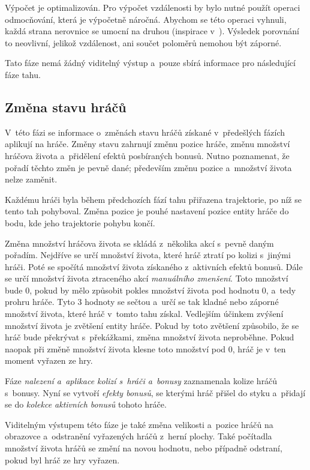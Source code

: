 Výpočet je optimalizován. Pro výpočet vzdálenosti by bylo nutné použít operaci odmocňování, která je výpočetně náročná. Abychom se této operaci vyhnuli, každá strana nerovnice se umocní na druhou (inspirace v~\cite{CGAL_Exact_Computation_paradigm}). Výsledek porovnání to neovlivní, jelikož vzdálenost, ani součet poloměrů nemohou být záporné.

Tato fáze nemá žádný viditelný výstup a~pouze sbírá informace pro následující fáze tahu.

\subsection*{Změna stavu hráčů}

V~této fázi se informace o~změnách stavu hráčů získané v~předešlých fázích aplikují na hráče. Změny stavu zahrnují změnu pozice hráče, změnu množství hráčova života a~přidělení efektů posbíraných bonusů. Nutno poznamenat, že pořadí těchto změn je pevně dané; především změnu pozice a~množství života nelze zaměnit.

Každému hráči byla během předchozích fází tahu přiřazena trajektorie, po níž se tento tah pohyboval. Změna pozice je pouhé nastavení pozice entity hráče do bodu, kde jeho trajektorie pohybu končí.

Změna množství hráčova života se skládá z~několika akcí s~pevně daným pořadím. Nejdříve se určí množství života, které hráč ztratí po kolizi s~jinými hráči. Poté se spočítá množství života získaného z~aktivních efektů bonusů. Dále se určí množství života ztraceného akcí \emph{manuálního zmenšení}. Toto množství bude 0, pokud by mělo způsobit pokles množství života pod hodnotu 0, a~tedy prohru hráče. Tyto 3 hodnoty se sečtou a~určí se tak kladné nebo záporné množství života, které hráč v~tomto tahu získal. Vedlejším účinkem zvýšení množství života je zvětšení entity hráče. Pokud by toto zvětšení způsobilo, že se hráč bude překrývat s~překážkami, změna množství života neproběhne. Pokud naopak při změně množství života klesne toto množství pod 0, hráč je v~ten moment vyřazen ze hry.

Fáze \emph{nalezení a~aplikace kolizí s~hráči a~bonusy} zaznamenala kolize hráčů s~bonusy. Nyní se vytvoří \emph{efekty bonusů}, se kterými hráč přišel do styku a~přidají se do \emph{kolekce aktivních bonusů} tohoto hráče.

Viditelným výstupem této fáze je také změna velikosti a~pozice hráčů na obrazovce a~odstranění vyřazených hráčů z~herní plochy. Také počítadla množství života hráčů se změní na novou hodnotu, nebo případně odstraní, pokud byl hráč ze hry vyřazen.

